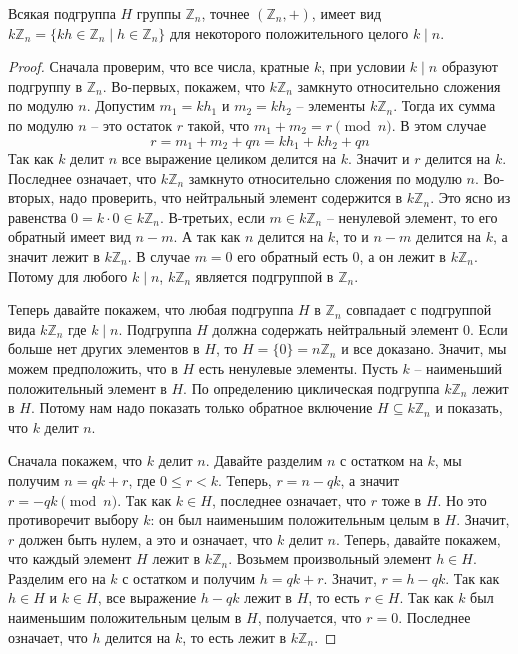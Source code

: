 \begin{claim}
\label{claim::Znsubgroups}
Всякая подгруппа $H$ группы $\mathbb Z_n$, точнее $(\mathbb Z_n, +)$, имеет вид $k\mathbb Z_n =\{kh\in \mathbb Z_n \mid h\in \mathbb Z_n\}$ для некоторого положительного целого $k \mid n$.
\end{claim}
\begin{proof}
Сначала проверим, что все числа, кратные $k$, при условии $k \mid n$ образуют подгруппу в $\mathbb Z_n$.
Во-первых, покажем, что $k\mathbb Z_n$ замкнуто относительно сложения по модулю $n$.
Допустим $m_1 = k h_1$ и $m_2 = k h_2$ -- элементы $k \mathbb Z_n$.
Тогда их сумма по модулю $n$ -- это остаток $r$ такой, что $ m_1+ m_2 = r \pmod{n}$.
В этом случае
\[
r = m_1 + m_2 + q n = k h_1 + kh_2 + qn
\]
Так как $k$ делит $n$ все выражение целиком делится на $k$.
Значит и $r$ делится на $k$.
Последнее означает, что $k \mathbb Z_n$ замкнуто относительно сложения по модулю $n$.
Во-вторых,  надо проверить, что нейтральный элемент содержится в $k\mathbb Z_n$.
Это ясно из равенства $0 = k \cdot 0\in k\mathbb Z_n$.
В-третьих, если $m\in k\mathbb Z_n$ -- ненулевой элемент, то его обратный имеет вид $n - m$.
А так как $n$ делится на $k$, то и $n - m$ делится на $k$, а значит лежит в $k\mathbb Z_n$.
В случае $m = 0$ его обратный есть $0$, а он лежит в $k \mathbb Z_n$.
Потому для любого $k \mid n$, $k\mathbb Z_n$ является подгруппой в $\mathbb Z_n$.

Теперь давайте покажем, что любая подгруппа $H$ в $\mathbb Z_n$ совпадает с подгруппой вида $k\mathbb Z_n$ где $k\mid n$.
Подгруппа $H$ должна содержать нейтральный элемент  $0$.
Если больше нет других элементов в $H$, то $H = \{0\} = n \mathbb Z_n$ и все доказано.
Значит, мы можем предположить, что в $H$ есть ненулевые элементы.
Пусть $k$ -- наименьший положительный элемент в $H$.
По определению циклическая подгруппа $k\mathbb Z_n$ лежит в $H$.
Потому нам надо показать только обратное включение $H\subseteq k \mathbb Z_n$ и показать, что $k$ делит $n$.

Сначала покажем, что $k$ делит $n$.
Давайте разделим $n$ с остатком на $k$, мы получим $n = qk + r$, где $0\leqslant r < k$.
Теперь, $r = n - q k$, а значит $r = -q k \pmod{n}$.
Так как $k\in H$, последнее означает, что $r$ тоже в $H$.
Но это противоречит выбору $k$: он был наименьшим положительным целым в $H$.
Значит, $r$ должен быть нулем, а это и означает, что $k$ делит $n$.
Теперь, давайте покажем, что каждый элемент $H$ лежит в $k\mathbb Z_n$.
Возьмем произвольный элемент $h\in H$.
Разделим его на $k$ с остатком и получим $h = q k + r$.
Значит, $r = h - q k$.
Так как $h\in H$ и $k\in H$, все выражение $h - qk$ лежит в $H$, то есть $r\in H$.
Так как $k$ был наименьшим положительным целым в $H$, получается, что $r = 0$.
Последнее означает, что $h$ делится на $k$, то есть лежит в $k\mathbb Z_n$.
\end{proof}

